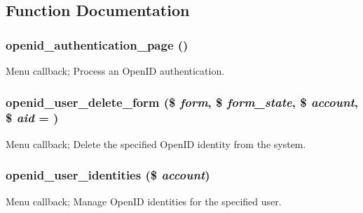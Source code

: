 \subsection{Function Documentation}
\hypertarget{openid_8pages_8inc_a4dd922a70115cdc900fdfd9afaa24f7b}{
\subsubsection[{openid\_\-authentication\_\-page}]{\setlength{\rightskip}{0pt plus 5cm}openid\_\-authentication\_\-page ()}}
\label{openid_8pages_8inc_a4dd922a70115cdc900fdfd9afaa24f7b}
Menu callback; Process an OpenID authentication. \hypertarget{openid_8pages_8inc_a35f3314da4ff4bb261372bf81b618cbc}{
\subsubsection[{openid\_\-user\_\-delete\_\-form}]{\setlength{\rightskip}{0pt plus 5cm}openid\_\-user\_\-delete\_\-form (\$ {\em form}, \/  \$ {\em form\_\-state}, \/  \$ {\em account}, \/  \$ {\em aid} = {})}}
\label{openid_8pages_8inc_a35f3314da4ff4bb261372bf81b618cbc}
Menu callback; Delete the specified OpenID identity from the system. \hypertarget{openid_8pages_8inc_a0f409e32ec8c303f8143f13f79eae76c}{
\subsubsection[{openid\_\-user\_\-identities}]{\setlength{\rightskip}{0pt plus 5cm}openid\_\-user\_\-identities (\$ {\em account})}}
\label{openid_8pages_8inc_a0f409e32ec8c303f8143f13f79eae76c}
Menu callback; Manage OpenID identities for the specified user. 